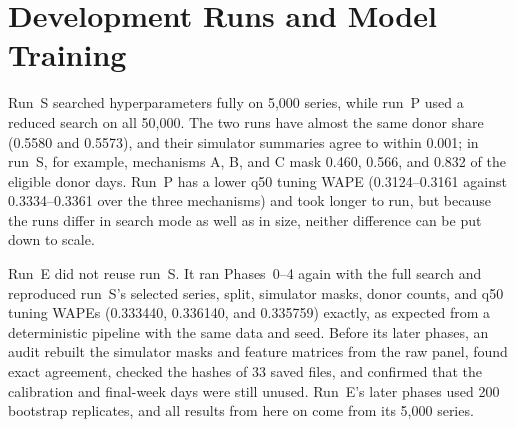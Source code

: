 \section{Development Runs and Model Training}
\label{sec:scale}

\begin{table}[t]
\centering\footnotesize
\caption{Pre-Specified Paired Contrasts for the Pooled-Conformal Policy over the Three Matched Histories (Negative Values Favor Pooled Conformal)}
\label{tab:contrasts}

\end{table}

Run~S searched hyperparameters fully on 5,000 series, while run~P used a reduced search on all 50,000. The two runs have almost the same donor share (0.5580 and 0.5573), and their simulator summaries agree to within 0.001; in run~S, for example, mechanisms A, B, and C mask 0.460, 0.566, and 0.832 of the eligible donor days. Run~P has a lower q50 tuning WAPE (0.3124--0.3161 against 0.3334--0.3361 over the three mechanisms) and took longer to run, but because the runs differ in search mode as well as in size, neither difference can be put down to scale.

Run~E did not reuse run~S. It ran Phases~0--4 again with the full search and reproduced run~S's selected series, split, simulator masks, donor counts, and q50 tuning WAPEs (0.333440, 0.336140, and 0.335759) exactly, as expected from a deterministic pipeline with the same data and seed. Before its later phases, an audit rebuilt the simulator masks and feature matrices from the raw panel, found exact agreement, checked the hashes of 33 saved files, and confirmed that the calibration and final-week days were still unused. Run~E's later phases used 200 bootstrap replicates, and all results from here on come from its 5,000 series.
